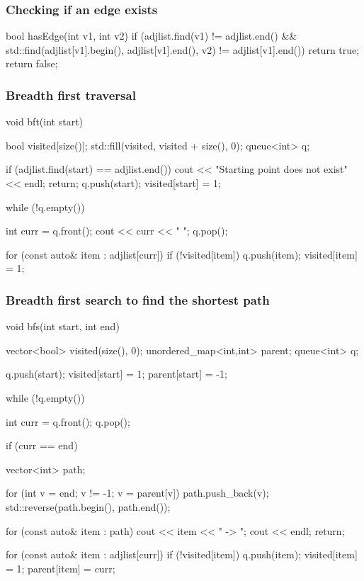 \documentclass{report}
\begin{document}
\bigbreak \noindent 
\subsubsection{Checking if an edge exists}
\bigbreak \noindent 
\begin{cppcode}
    bool hasEdge(int v1, int v2) {
        if (adjlist.find(v1) != adjlist.end() && std::find(adjlist[v1].begin(), adjlist[v1].end(), v2) != adjlist[v1].end()) {
            return true;
        } return false;
    }
\end{cppcode}

\pagebreak 
\subsubsection{Breadth first traversal}
\bigbreak \noindent 
\begin{cppcode}
   void bft(int start) {
        bool visited[size()]; 
        std::fill(visited, visited + size(), 0);
        queue<int> q;

        if (adjlist.find(start) == adjlist.end()) {
            cout << "Starting point does not exist" << endl;
            return;
        }
        q.push(start);
        visited[start] = 1;

        while (!q.empty()) {
            int curr = q.front();
            cout << curr << " ";
            q.pop();

            for (const auto& item : adjlist[curr]) {
                if (!visited[item]) {
                    q.push(item);
                    visited[item] = 1;
                }
            }
        }
   }
\end{cppcode}

\pagebreak 
\subsubsection{Breadth first search to find the shortest path}
\bigbreak \noindent 
\begin{cppcode}
    void bfs(int start, int end) {
        vector<bool> visited(size(), 0);
        unordered_map<int,int> parent;
        queue<int> q;

        q.push(start);
        visited[start] = 1;
        parent[start] = -1;

        while (!q.empty()) {
            int curr = q.front();
            q.pop();

            if (curr == end) {
                vector<int> path;

                for (int v = end; v != -1; v = parent[v]) {
                    path.push_back(v);
                }
                std::reverse(path.begin(), path.end());

                for (const auto& item : path) {
                    cout << item << " -> ";
                }
                cout << endl;
                return;
            }


            for (const auto& item : adjlist[curr]) {
                if (!visited[item]) {
                    q.push(item);
                    visited[item] = 1;
                    parent[item] = curr;
                }
            }
        }
    }
\end{cppcode}
\end{document}
